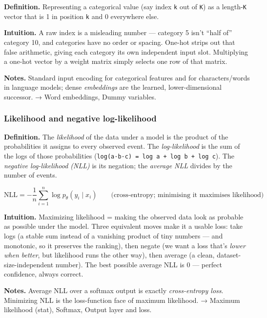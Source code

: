 \documentclass[
  10pt,
  letterpaper,
  onecolumn]{article}
\begin{document}
\textbf{Definition.} Representing a categorical value (say index
\texttt{k} out of \texttt{K}) as a length-\texttt{K} vector that is 1 in
position \texttt{k} and 0 everywhere else.

\textbf{Intuition.} A raw index is a misleading number --- category 5
isn't ``half of'' category 10, and categories have no order or spacing.
One-hot strips out that false arithmetic, giving each category its own
independent input slot. Multiplying a one-hot vector by a weight matrix
simply selects one row of that matrix.

\textbf{Notes.} Standard input encoding for categorical features and for
characters/words in language models; dense \emph{embeddings} are the
learned, lower-dimensional successor. → Word embeddings, Dummy
variables.

\hypertarget{likelihood-and-negative-log-likelihood}{%
\subsubsection{Likelihood and negative
log-likelihood}\label{likelihood-and-negative-log-likelihood}}

\textbf{Definition.} The \emph{likelihood} of the data under a model is
the product of the probabilities it assigns to every observed event. The
\emph{log-likelihood} is the sum of the logs of those probabilities
(\texttt{log(a·b·c)\ =\ log\ a\ +\ log\ b\ +\ log\ c}). The
\emph{negative log-likelihood (NLL)} is its negation; the \emph{average
NLL} divides by the number of events.

\begin{equation*}
\mathrm{NLL}=-\frac{1}{n}\sum_{i=1}^{n}\log p_{\theta}(y_i\mid x_i)
\qquad\text{(cross-entropy; minimising it maximises likelihood)}
\end{equation*}

\textbf{Intuition.} Maximizing likelihood = making the observed data
look as probable as possible under the model. Three equivalent moves
make it a usable loss: take logs (a stable sum instead of a vanishing
product of tiny numbers --- and monotonic, so it preserves the ranking),
then negate (we want a loss that's \emph{lower when better}, but
likelihood runs the other way), then average (a clean,
dataset-size-independent number). The best possible average NLL is 0 ---
perfect confidence, always correct.

\textbf{Notes.} Average NLL over a softmax output is exactly
\emph{cross-entropy loss}. Minimizing NLL is the loss-function face of
maximum likelihood. → Maximum likelihood (stat), Softmax, Output layer
and loss.
\end{document}

